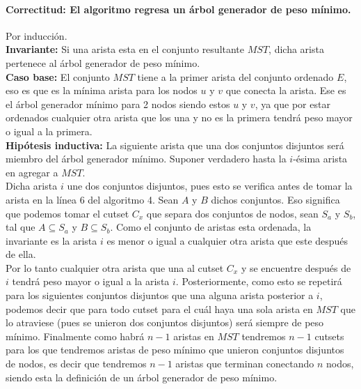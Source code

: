 \documentclass[12pt]{article}
\begin{document}
\paragraph{Correctitud: El algoritmo regresa un árbol generador de peso mínimo.}
Por inducción.\\
\textbf{Invariante: } Si una arista esta en el conjunto resultante $MST$, dicha arista pertenece al árbol generador de peso mínimo.\\
\textbf{Caso base:} El conjunto $MST$ tiene a la primer arista del conjunto ordenado $E$, eso es que es la mínima arista para los nodos $u$ y $v$ que conecta la arista. Ese es el árbol generador mínimo para 2 nodos siendo estos $u$ y $v$, ya que por estar ordenados cualquier otra arista que los una y no es la primera tendrá peso mayor o igual a la primera.\\
\textbf{Hipótesis inductiva:} La siguiente arista que una dos conjuntos disjuntos será miembro del árbol generador mínimo.
Suponer verdadero hasta la $i$-ésima arista en agregar a $MST$.\\
Dicha arista $i$ une dos conjuntos disjuntos, pues esto se verifica antes de tomar la arista en la línea 6 del algoritmo 4. Sean $A$ y $B$ dichos conjuntos. Eso significa que podemos tomar el cutset $C_x$ que separa dos conjuntos de nodos, sean $S_a$ y $S_b$, tal que $A\subseteq S_a$ y $B\subseteq S_b$. Como el conjunto de aristas esta ordenada, la invariante es la arista $i$ es menor o igual a cualquier otra arista que este después de ella.\\
Por lo tanto cualquier otra arista que una al cutset $C_x$ y se encuentre después de $i$ tendrá peso mayor o igual a la arista $i$. Posteriormente, como esto se repetirá para los siguientes conjuntos disjuntos que una alguna arista posterior a $i$, podemos decir que para todo cutset para el cuál haya una sola arista en $MST$ que lo atraviese (pues se unieron dos conjuntos disjuntos) será siempre de peso mínimo. Finalmente como habrá $n-1$ aristas en $MST$ tendremos $n-1$ cutsets para los que tendremos aristas de peso mínimo que unieron conjuntos disjuntos de nodos, es decir que tendremos $n-1$ aristas que terminan conectando $n$ nodos, siendo esta la definición de un árbol generador de peso mínimo. 
\end{document}
